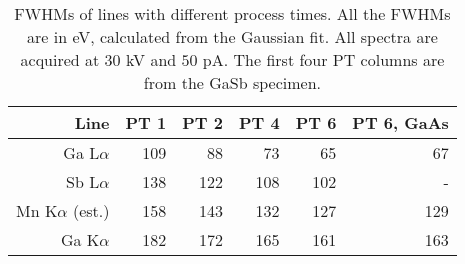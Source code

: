 \begin{table}[phtb]
    \begin{center}
        \caption{
            FWHMs of lines with different process times.
            All the FWHMs are in eV, calculated from the Gaussian fit.
            All spectra are acquired at $30$ kV and $50$ pA.
            The first four PT columns are from the GaSb specimen.
        }
        \renewcommand*{\arraystretch}{1.4}
        \label{tab:results:PTvsFWHMs}
        \begin{tabular}{rrrrrr}
            \hline
            \textbf{Line}       & \textbf{PT 1} & \textbf{PT 2} & \textbf{PT 4} & \textbf{PT 6} & \textbf{PT 6, GaAs} \\
            \hline
            Ga L$\alpha$        & 109           & 88            & 73            & 65            & 67                  \\
            Sb L$\alpha$        & 138           & 122           & 108           & 102           & -                   \\
            Mn K$\alpha$ (est.) & 158           & 143           & 132           & 127           & 129                 \\
            Ga K$\alpha$        & 182           & 172           & 165           & 161           & 163                 \\
            \hline
        \end{tabular}
    \end{center}
\end{table}
